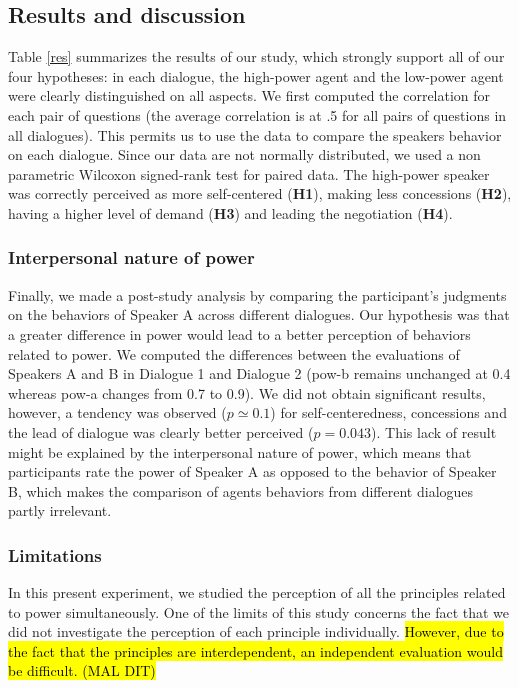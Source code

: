 \documentclass{llncs}
\begin{document}
			\subsection{Results and discussion}
			\vspace{-.5em} 
			Table  \ref{res} summarizes the results of our study, which strongly support all of our four hypotheses: in each dialogue, the high-power agent and the low-power agent were clearly distinguished on all aspects. We first computed the correlation for each pair of questions (the average correlation is at .5 for all pairs of questions in all dialogues). This permits us to use the data to compare the speakers behavior on each dialogue. Since our data are not normally distributed, we used a non parametric Wilcoxon signed-rank test for paired data. The high-power speaker was correctly perceived as more self-centered (\textbf{H1}), making less concessions (\textbf{H2}), having a higher level of demand (\textbf{H3}) and leading the negotiation (\textbf{H4}).
			\subsubsection{Interpersonal nature of power}
			Finally, we made a post-study analysis by comparing the participant's judgments on the behaviors of Speaker A across different dialogues. Our hypothesis was that a greater difference in power would lead to a better perception of behaviors related to power. We computed the differences between the evaluations of Speakers A and B in Dialogue 1 and Dialogue 2 (pow-b remains unchanged at 0.4 whereas pow-a changes from 0.7 to 0.9). We did not obtain significant results, however, a tendency was observed ($p\simeq 0.1$) for self-centeredness, concessions and the lead of dialogue was clearly better perceived ($p=0.043$). This lack of result might be explained by the interpersonal nature of power, which means that participants rate the power of Speaker A as opposed to the behavior of Speaker B, which makes the comparison of agents behaviors from different dialogues partly irrelevant.
			
			\subsubsection{Limitations}
			In this present experiment, we studied the perception of all the principles related to power simultaneously. One of the limits of this study concerns the fact that we did not investigate the perception of each principle individually. \hl{However, due to the fact that the principles are interdependent, an independent evaluation would be difficult. (MAL DIT)}
			
\end{document}
